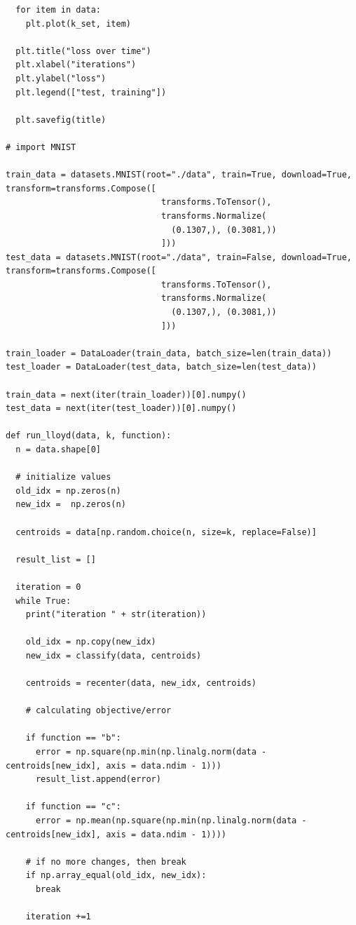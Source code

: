 \documentclass{article}
\newcommand{\1}{\mathbf{1}}
\begin{document}
{\begin{verbatim}
  for item in data:
    plt.plot(k_set, item)

  plt.title("loss over time")
  plt.xlabel("iterations")
  plt.ylabel("loss")
  plt.legend(["test, training"])

  plt.savefig(title)

# import MNIST

train_data = datasets.MNIST(root="./data", train=True, download=True, transform=transforms.Compose([
                               transforms.ToTensor(),
                               transforms.Normalize(
                                 (0.1307,), (0.3081,))
                               ]))
test_data = datasets.MNIST(root="./data", train=False, download=True, transform=transforms.Compose([
                               transforms.ToTensor(),
                               transforms.Normalize(
                                 (0.1307,), (0.3081,))
                               ]))

train_loader = DataLoader(train_data, batch_size=len(train_data))
test_loader = DataLoader(test_data, batch_size=len(test_data))

train_data = next(iter(train_loader))[0].numpy()
test_data = next(iter(test_loader))[0].numpy()

def run_lloyd(data, k, function):
  n = data.shape[0]

  # initialize values
  old_idx = np.zeros(n)
  new_idx =  np.zeros(n)

  centroids = data[np.random.choice(n, size=k, replace=False)]

  result_list = []

  iteration = 0
  while True:
    print("iteration " + str(iteration))

    old_idx = np.copy(new_idx)
    new_idx = classify(data, centroids)

    centroids = recenter(data, new_idx, centroids)

    # calculating objective/error  

    if function == "b":
      error = np.square(np.min(np.linalg.norm(data - centroids[new_idx], axis = data.ndim - 1)))
      result_list.append(error)

    if function == "c":
      error = np.mean(np.square(np.min(np.linalg.norm(data - centroids[new_idx], axis = data.ndim - 1))))

    # if no more changes, then break
    if np.array_equal(old_idx, new_idx):
      break

    iteration +=1
  

\end{verbatim}}
\end{document}

